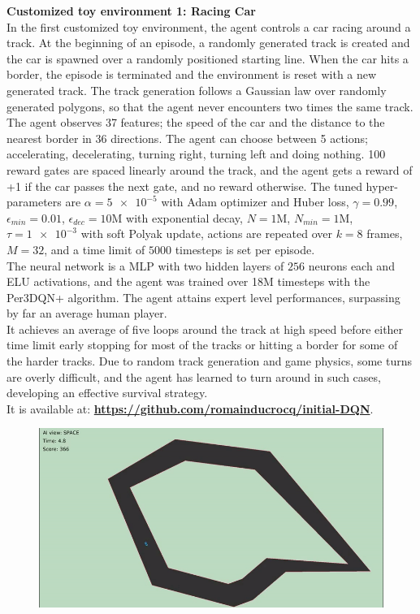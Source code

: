 \textbf{Customized toy environment 1: Racing Car} \\
In the first customized toy environment, the agent controls a car racing around a track. At the beginning of an episode, a randomly generated track is created and the car is spawned over a randomly positioned starting line. When the car hits a border, the episode is terminated and the environment is reset with a new generated track. The track generation follows a Gaussian law over randomly generated polygons, so that the agent never encounters two times the same track. The agent observes 37 features; the speed of the car and the distance to the nearest border in 36 directions. The agent can choose between 5 actions; accelerating, decelerating, turning right, turning left and doing nothing. 100 reward gates are spaced linearly around the track, and the agent gets a reward of +1 if the car passes the next gate, and no reward otherwise. The tuned hyper-parameters are $\alpha=\num{5e-5}$ with Adam optimizer and Huber loss, $\gamma=0.99$, $\epsilon_{min}=0.01$, $\epsilon_{dec}=10$M with exponential decay, $N=1$M, $N_{min}=1$M, $\tau=\num{1e-3}$ with soft Polyak update, actions are repeated over $k=8$ frames, $M=32$, and a time limit of $5000$ timesteps is set per episode. \\ The neural network is a MLP with two hidden layers of $256$ neurons each and ELU activations, and the agent was trained over 18M timesteps with the Per3DQN+ algorithm.
The agent attains expert level performances, surpassing by far an average human player. \\
It achieves an average of five loops around the track at high speed before either time limit early stopping for most of the tracks or hitting a border for some of the harder tracks. Due to random track generation and game physics, some turns are overly difficult, and the agent has learned to turn around in such cases, developing an effective survival strategy. \\
It is available at: \textbf{\url{https://github.com/romainducrocq/initial-DQN}}. \\

\begin{figure}[h]
\includegraphics[scale=0.5]{img/I/Selection_107.png}
\centering
\end{figure}

